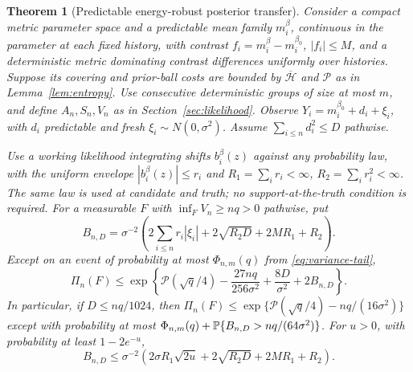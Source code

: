 \documentclass[11pt,reqno]{amsart}
\newtheorem{theorem}{Theorem}[section]
\theoremstyle{remark}\newtheorem{remark}[theorem]{Remark}
\begin{document}
\begin{theorem}[Predictable energy-robust posterior transfer]
\label{thm:energy}
Consider a compact metric parameter space and a predictable mean family
$m_i^\beta$, continuous in the parameter at each fixed history, with
contrast $f_i=m_i^\beta-m_i^{\beta_0}$, $|f_i|\le M$, and a deterministic
metric dominating contrast differences uniformly over histories. Suppose
its covering and prior-ball costs are bounded by
$\overline{\mathcal H}$ and $\mathcal P$ as in Lemma~\ref{lem:entropy}.
Use consecutive deterministic groups of size at most $m$, and define
$A_n,S_n,V_n$ as in Section~\ref{sec:likelihood}. Observe
$Y_i=m_i^{\beta_0}+d_i+\xi_i$, with $d_i$ predictable and fresh
$\xi_i\sim N(0,\sigma^2)$. Assume $\sum_{i\le n}d_i^2\le D$ pathwise.

Use a working likelihood integrating shifts $b_i^\beta(z)$ against any
probability law, with the uniform envelope $|b_i^\beta(z)|\le r_i$ and
$R_1=\sum_i r_i<\infty$, $R_2=\sum_i r_i^2<\infty$. The same law is used
at candidate and truth; no support-at-the-truth condition is required.
For a measurable $F$ with $\inf_F V_n\ge nq>0$ pathwise, put
\begin{equation}
 B_{n,D}=\sigma^{-2}\left(2\sum_{i\le n}r_i|\xi_i|
       +2\sqrt{R_2D}+2MR_1+R_2\right).
 \label{eq:energy-B}
\end{equation}
Except on an event of probability at most $\Phi_{n,m}(q)$ from
\eqref{eq:variance-tail},
\begin{equation}
 \Pi_n(F)\le\exp\left\{\mathcal P(\sqrt q/4)
 -\frac{27nq}{256\sigma^2}+\frac{8D}{\sigma^2}+2B_{n,D}\right\}.
 \label{eq:energy-posterior}
\end{equation}
In particular, if $D\le nq/1024$, then
$\Pi_n(F)\le\exp\{\mathcal P(\sqrt q/4)-nq/(16\sigma^2)\}$
except with probability at most
$\Phi_{n,m}(q)+\mathbb P\{B_{n,D}>nq/(64\sigma^2)\}$.
For $u>0$, with probability at least $1-2e^{-u}$,
\begin{equation}
 B_{n,D}\le\sigma^{-2}
 \left(2\sigma R_1\sqrt{2u}+2\sqrt{R_2D}+2MR_1+R_2\right).
 \label{eq:energy-tail}
\end{equation}
\end{theorem}
\end{document}
